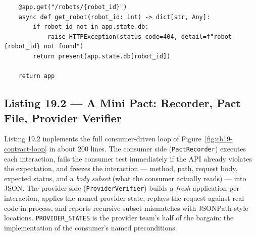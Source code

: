 \begin{verbatim}
    @app.get("/robots/{robot_id}")
    async def get_robot(robot_id: int) -> dict[str, Any]:
        if robot_id not in app.state.db:
            raise HTTPException(status_code=404, detail=f"robot {robot_id} not found")
        return present(app.state.db[robot_id])

    return app
\end{verbatim}

\subsection{Listing 19.2 --- A Mini Pact: Recorder, Pact File, Provider Verifier}
\label{sec:ch19-listing-pact}

Listing 19.2 implements the full consumer-driven loop of
Figure~\ref{fig:ch19-contract-loop} in about 200 lines. The consumer side
(\texttt{PactRecorder}) executes each interaction, fails the consumer test
immediately if the API already violates the expectation, and freezes the
interaction --- method, path, request body, expected status, and a
\emph{body subset} (what the consumer actually reads) --- into JSON. The
provider side (\texttt{ProviderVerifier}) builds a \emph{fresh} application
per interaction, applies the named provider state, replays the request
against real code in-process, and reports recursive subset mismatches with
JSONPath-style locations. \texttt{PROVIDER\_STATES} is the provider team's
half of the bargain: the implementation of the consumer's named
preconditions.

